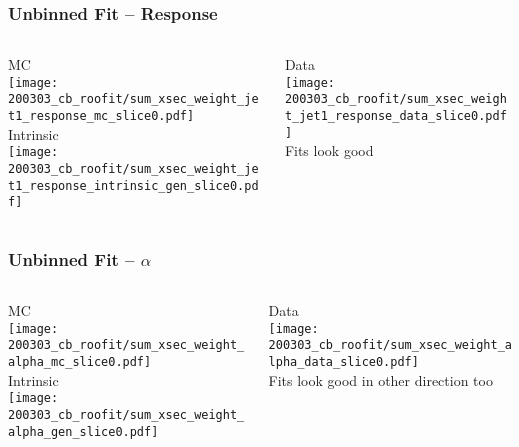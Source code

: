 \documentclass{beamer}
\begin{document}
\begin{frame}
  \frametitle{Unbinned Fit -- Response}

  \begin{columns}
    \begin{column}{0.5\linewidth}
      \centering
      MC \\
      \texttt{[image: 200303\_cb\_roofit/sum\_xsec\_weight\_jet1\_response\_mc\_slice0.pdf]} \\
      Intrinsic \\
      \texttt{[image: 200303\_cb\_roofit/sum\_xsec\_weight\_jet1\_response\_intrinsic\_gen\_slice0.pdf]}
    \end{column}
    \begin{column}{0.5\linewidth}
      \centering
      Data \\
      \texttt{[image: 200303\_cb\_roofit/sum\_xsec\_weight\_jet1\_response\_data\_slice0.pdf]} \\
      Fits look good
    \end{column}
  \end{columns}

\end{frame}


\begin{frame}
  \frametitle{Unbinned Fit -- $\alpha$}

  \begin{columns}
    \begin{column}{0.5\linewidth}
      \centering
      MC \\
      \texttt{[image: 200303\_cb\_roofit/sum\_xsec\_weight\_alpha\_mc\_slice0.pdf]} \\
      Intrinsic \\
      \texttt{[image: 200303\_cb\_roofit/sum\_xsec\_weight\_alpha\_gen\_slice0.pdf]}
    \end{column}
    \begin{column}{0.5\linewidth}
      \centering
      Data \\
      \texttt{[image: 200303\_cb\_roofit/sum\_xsec\_weight\_alpha\_data\_slice0.pdf]} \\
      Fits look good in other direction too
    \end{column}
  \end{columns}


\end{frame}
\end{document}
